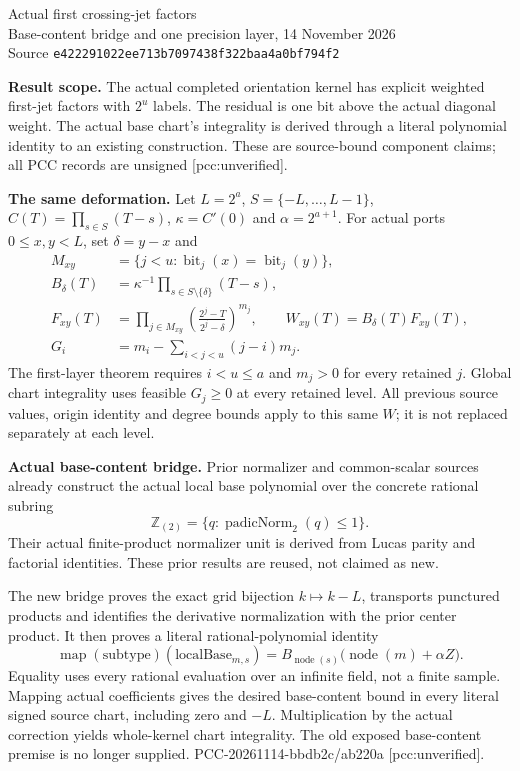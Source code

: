 \documentclass[10pt]{article}
\begin{document}
\begin{center}
{\Large Actual first crossing-jet factors}\\[4pt]
Base-content bridge and one precision layer, 14 November 2026\\
Source \texttt{e422291022ee713b7097438f322baa4a0bf794f2}
\end{center}

\textbf{Result scope.} The actual completed orientation kernel has explicit
weighted first-jet factors with $2^u$ labels. The residual is one bit above
the actual diagonal weight. The actual base chart's integrality is derived
through a literal polynomial identity to an existing construction. These
are source-bound component claims; all PCC records are unsigned
[pcc:unverified].

\textbf{The same deformation.} Let $L=2^a$, $S=\{-L,\ldots,L-1\}$,
$C(T)=\prod_{s\in S}(T-s)$, $\kappa=C'(0)$ and $\alpha=2^{a+1}$.
For actual ports $0\le x,y<L$, set $\delta=y-x$ and
\begin{align*}
M_{xy}&=\{j<u:\operatorname{bit}_j(x)=\operatorname{bit}_j(y)\},\\
B_\delta(T)&=\kappa^{-1}\prod_{s\in S\setminus\{\delta\}}(T-s),\\
F_{xy}(T)&=\prod_{j\in M_{xy}}\left(\frac{2^j-T}{2^j-\delta}\right)^{m_j},
\qquad W_{xy}(T)=B_\delta(T)F_{xy}(T),\\
G_i&=m_i-\sum_{i<j<u}(j-i)m_j.
\end{align*}
The first-layer theorem requires $i<u\le a$ and $m_j>0$ for every
retained $j$. Global chart integrality uses feasible $G_j\ge0$ at every
retained level. All previous source values, origin identity and degree
bounds apply to this same $W$; it is not replaced separately at each level.

\textbf{Actual base-content bridge.} Prior normalizer and common-scalar
sources already construct the actual local base polynomial over the
concrete rational subring
\[\mathbb Z_{(2)}=\{q:\operatorname{padicNorm}_2(q)\le1\}.\]
Their actual finite-product normalizer unit is derived from Lucas parity and
factorial identities. These prior results are reused, not claimed as new.

The new bridge proves the exact grid bijection $k\mapsto k-L$, transports
punctured products and identifies the derivative normalization with the
prior center product. It then proves a literal rational-polynomial identity
\[
\operatorname{map}(\mathrm{subtype})(\mathrm{localBase}_{m,s})
 =B_{\operatorname{node}(s)}\bigl(\operatorname{node}(m)+\alpha Z\bigr).
\]
Equality uses every rational evaluation over an infinite field, not a finite
sample. Mapping actual coefficients gives the desired base-content bound in
every literal signed source chart, including zero and $-L$. Multiplication
by the actual correction yields whole-kernel chart integrality. The old
exposed base-content premise is no longer supplied.
PCC-20261114-bbdb2c/ab220a [pcc:unverified].
\end{document}
